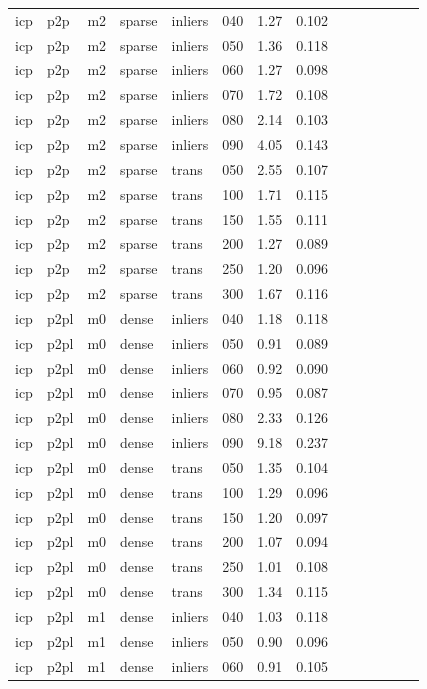 \begin{table}[htbp]
\begin{tabular}{llllllrrrrrrrr}
  icp & p2p & m2 & sparse & inliers & 040 & 1.27 & 0.102 \\
  icp & p2p & m2 & sparse & inliers & 050 & 1.36 & 0.118 \\
  icp & p2p & m2 & sparse & inliers & 060 & 1.27 & 0.098 \\
  icp & p2p & m2 & sparse & inliers & 070 & 1.72 & 0.108 \\
  icp & p2p & m2 & sparse & inliers & 080 & 2.14 & 0.103 \\
  icp & p2p & m2 & sparse & inliers & 090 & 4.05 & 0.143 \\
  icp & p2p & m2 & sparse & trans & 050 & 2.55 & 0.107 \\
  icp & p2p & m2 & sparse & trans & 100 & 1.71 & 0.115 \\
  icp & p2p & m2 & sparse & trans & 150 & 1.55 & 0.111 \\
  icp & p2p & m2 & sparse & trans & 200 & 1.27 & 0.089 \\
  icp & p2p & m2 & sparse & trans & 250 & 1.20 & 0.096 \\
  icp & p2p & m2 & sparse & trans & 300 & 1.67 & 0.116 \\
  icp & p2pl & m0 & dense & inliers & 040 & 1.18 & 0.118 \\
  icp & p2pl & m0 & dense & inliers & 050 & 0.91 & 0.089 \\
  icp & p2pl & m0 & dense & inliers & 060 & 0.92 & 0.090 \\
  icp & p2pl & m0 & dense & inliers & 070 & 0.95 & 0.087 \\
  icp & p2pl & m0 & dense & inliers & 080 & 2.33 & 0.126 \\
  icp & p2pl & m0 & dense & inliers & 090 & 9.18 & 0.237 \\
  icp & p2pl & m0 & dense & trans & 050 & 1.35 & 0.104 \\
  icp & p2pl & m0 & dense & trans & 100 & 1.29 & 0.096 \\
  icp & p2pl & m0 & dense & trans & 150 & 1.20 & 0.097 \\
  icp & p2pl & m0 & dense & trans & 200 & 1.07 & 0.094 \\
  icp & p2pl & m0 & dense & trans & 250 & 1.01 & 0.108 \\
  icp & p2pl & m0 & dense & trans & 300 & 1.34 & 0.115 \\
  icp & p2pl & m1 & dense & inliers & 040 & 1.03 & 0.118 \\
  icp & p2pl & m1 & dense & inliers & 050 & 0.90 & 0.096 \\
  icp & p2pl & m1 & dense & inliers & 060 & 0.91 & 0.105 \\

\end{tabular}
\end{table}
